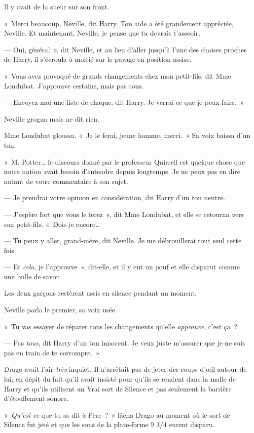 Il y avait de la sueur sur son front.

«~Merci beaucoup, Neville, dit Harry. Ton aide a été grandement appréciée, Neville. Et maintenant, Neville, je pense que tu devrais t'asseoir.

--- Oui, général~», dit Neville, et au lieu d'aller jusqu'à l'une des chaises proches de Harry, il s'écroula à moitié sur le pavage en position assise.

«~Vous avez provoqué de grands changements chez mon petit-fils, dit Mme Londubat. J'approuve certains, mais pas tous.

--- Envoyez-moi une liste de chaque, dit Harry. Je verrai ce que je peux faire.~»

Neville grogna mais ne dit rien.

Mme Londubat gloussa. «~Je le ferai, jeune homme, merci.~» Sa voix baissa d'un ton.

«~M. Potter… le discours donné par le professeur Quirrell est quelque chose que notre nation avait besoin d'entendre depuis longtemps. Je ne peux pas en dire autant de votre commentaire à son sujet.

--- Je prendrai votre opinion en considération, dit Harry d'un ton neutre.

--- J'espère fort que vous le ferez~», dit Mme Londubat, et elle se retourna vers son petit-fils. «~Dois-je encore…

--- Tu peux y aller, grand-mère, dit Neville. Je me débrouillerai tout seul cette fois.

--- Et \emph{cela}, je l'approuve~», dit-elle, et il y eut un pouf et elle disparut comme une bulle de savon.

Les deux garçons restèrent assis en silence pendant un moment.

Neville parla le premier, sa voix usée.

«~Tu vas essayer de réparer tous les changements qu'elle \emph{approuve}, c'est ça~?

--- Pas \emph{tous}, dit Harry d'un ton innocent. Je veux juste m'assurer que je ne suis pas en train de te corrompre.~»

\later

Drago avait l'air \emph{très} inquiet. Il n'arrêtait pas de jeter des coups d'œil autour de lui, en dépit du fait qu'il avait insisté pour qu'ils se rendent dans la malle de Harry et qu'ils utilisent un Vrai sort de Silence et pas seulement la barrière d'étouffement sonore.

«~\emph{Qu'est-ce} que tu as dit à Père~?~» lâcha Drago au moment où le sort de Silence fut jeté et que les sons de la plate-forme 9 3/4 eurent disparu.

